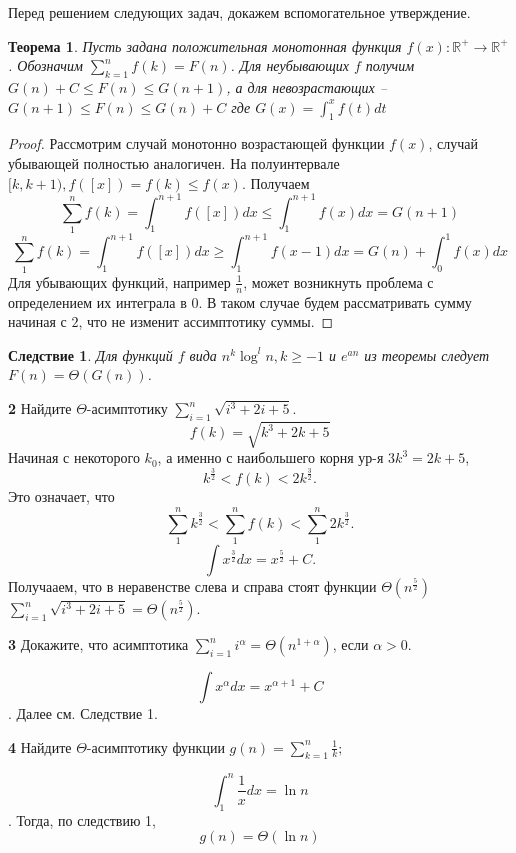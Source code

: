 \documentclass{article}
\newtheorem{corollary}{Следствие}[section]
\newtheorem{theorem*}{Теорема}
\begin{document}
Перед решением следующих задач, докажем вспомогательное утверждение.
\begin{theorem*}
  Пусть задана положительная монотонная функция $f(x): \mathbb{R}^{+}\rightarrow \mathbb{R}^{+}$.
  Обозначим $\sum_{k = 1}^{n}f(k) = F(n)$.
  Для неубывающих $f$ получим $G(n) + C \le F(n) \le G(n+1)$, а для невозрастающих --
  $G(n + 1) \le F(n) \le G(n)+C$
  где $G(x) = \int_{1}^{x} f(t)dt$
\end{theorem*}
\begin{proof}
  Рассмотрим случай монотонно возрастающей функции $f(x)$, случай убывающей полностью аналогичен.
  На полуинтервале $[k,k+1), f([x]) = f(k) \le f(x)$. Получаем
  \[\sum_{1}^{n}f(k) = \int_{1}^{n+1}f([x])dx \le \int_{1}^{n+1}f(x)dx = G(n+1)\]
  \[\sum_{1}^{n}f(k) = \int_{1}^{n+1}f([x])dx \ge \int_{1}^{n+1}f(x-1)dx = G(n) + \int_{0}^{1}f(x)dx\]
  Для убывающих функций, например $\frac 1 n$, может возникнуть проблема с определением их интеграла в $0$.
  В таком случае будем рассматривать сумму начиная с $2$, что не изменит ассимптотику суммы.
\end{proof}
\begin{corollary}
  Для функций $f$ вида $n^{k} \log^{l} n, k\ge -1$ и $e^{an}$ из теоремы следует $F(n) = \Theta(G(n))$.
\end{corollary}
\textbf{2} Найдите $\Theta$-асимптотику $\sum\limits_{i=1}^n \sqrt{i^3+2i+5}$.
\[f(k) = \sqrt{k^{3} + 2k + 5}\]
Начиная с некоторого $k_{0}$, а именно с наибольшего корня ур-я $3k^{3} = 2k + 5$,
\[k^{\frac 3 2} < f(k) < 2k^{\frac 3 2}.\]
Это означает, что
\[\sum_{1}^{n} k^{\frac 3 2} < \sum_{1}^{n}f(k) < \sum_{1}^{n}2k^{\frac 3 2}.\]
\[\int x^{\frac 3 2}dx = x^{\frac 5 2} + C.\]
Получааем, что в неравенстве слева и справа стоят функции $\Theta(n^{\frac 5 2})$
$\sum\limits_{i=1}^n \sqrt{i^3+2i+5} = \Theta(n^{\frac 5 2})$.

\medskip

\textbf{3} Докажите, что асимптотика $\sum^n_{i=1} i^{\alpha}
= \Theta(n^{1+\alpha})$, если
$\alpha > 0$.

\[\int x^{\alpha}dx = x^{\alpha+1}+C\]. Далее см. Следствие 1.
\medskip

\textbf{4} Найдите $\Theta$-асимптотику функции
$g(n) = \sum ^n_{k=1} \frac{1}{k};$

\[\int_{1}^{n} \frac{1}{x}dx = \ln n\]. Тогда, по следствию 1,
\[g(n) = \Theta(\ln n)\]
\medskip
\end{document}
